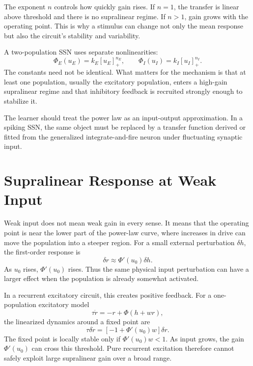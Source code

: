 The exponent $n$ controls how quickly gain rises. If $n=1$, the transfer is linear above threshold and there is no supralinear regime. If $n>1$, gain grows with the operating point. This is why a stimulus can change not only the mean response but also the circuit's stability and variability.

A two-population SSN uses separate nonlinearities:
%
\begin{equation}
  \Phi_E(u_E)=k_E[u_E]_{+}^{n_E},
  \qquad
  \Phi_I(u_I)=k_I[u_I]_{+}^{n_I}.
  \label{eq:ssn-two-transfer-functions}
\end{equation}
%
The constants need not be identical. What matters for the mechanism is that at least one population, usually the excitatory population, enters a high-gain supralinear regime and that inhibitory feedback is recruited strongly enough to stabilize it.

The learner should treat the power law as an input-output approximation. In a spiking SSN, the same object must be replaced by a transfer function derived or fitted from the generalized integrate-and-fire neuron under fluctuating synaptic input.

\section{Supralinear Response at Weak Input}
\label{sec:supralinear-response-weak-input}

Weak input does not mean weak gain in every sense. It means that the operating point is near the lower part of the power-law curve, where increases in drive can move the population into a steeper region. For a small external perturbation $\delta h$, the first-order response is
%
\begin{equation}
  \delta r
  \approx
  \Phi'(u_0)\delta h.
  \label{eq:ssn-small-signal-response}
\end{equation}
%
As $u_0$ rises, $\Phi'(u_0)$ rises. Thus the same physical input perturbation can have a larger effect when the population is already somewhat activated.

In a recurrent excitatory circuit, this creates positive feedback. For a one-population excitatory model
%
\begin{equation}
  \tau\dot r
  =
  -r+\Phi(h+w r),
  \label{eq:ssn-one-pop-excitatory}
\end{equation}
%
the linearized dynamics around a fixed point are
%
\begin{equation}
  \tau\delta\dot r
  =
  \left[-1+\Phi'(u_0)w\right]\delta r.
  \label{eq:ssn-one-pop-stability}
\end{equation}
%
The fixed point is locally stable only if $\Phi'(u_0)w<1$. As input grows, the gain $\Phi'(u_0)$ can cross this threshold. Pure recurrent excitation therefore cannot safely exploit large supralinear gain over a broad range.

